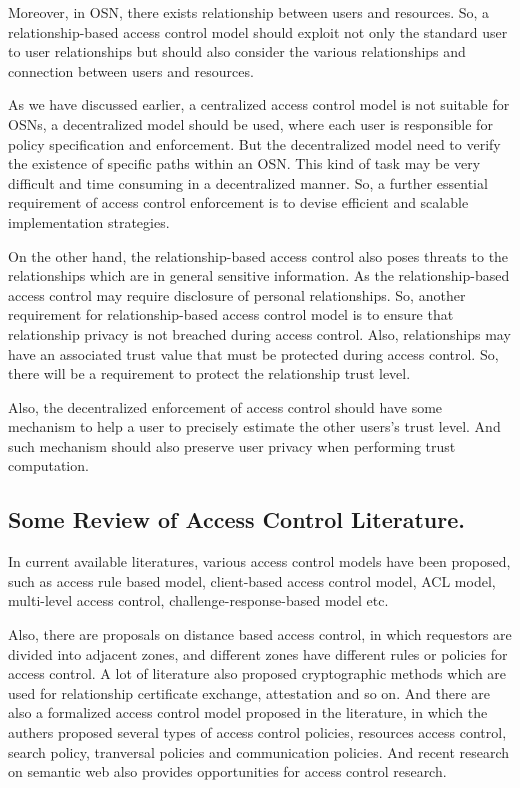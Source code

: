 \documentclass[12pt]{article}
\begin{document}
Moreover, in OSN, there exists relationship between users and
resources. So, a relationship-based access control model should
exploit not only the standard user to user relationships but should
also consider the various relationships and connection between users
and resources. 

As we have discussed earlier, a centralized access control model is
not suitable for OSNs, a decentralized model should be used, where
each user is responsible for policy specification and enforcement. But
the decentralized model need to verify the existence of specific paths
within an OSN. This kind of task may be very difficult and time
consuming in a decentralized manner. So, a further essential
requirement of access control enforcement is to devise efficient and
scalable implementation strategies.

On the other hand, the relationship-based access control also poses
threats to the relationships which are in general sensitive
information. As the relationship-based access control may require
disclosure of personal relationships. So, another requirement for
relationship-based access control model is to ensure that relationship
privacy is not breached during access control. Also, relationships may
have an associated trust value that must be protected during access
control. So, there will be a requirement to protect the relationship
trust level.

Also, the decentralized enforcement of access control should have some
mechanism to help a user to precisely estimate the other users's trust
level. And such mechanism should also preserve user privacy when
performing trust computation. 

\subsection{Some Review of Access Control Literature.}
In current available literatures, various access control models have
been proposed, such as access rule based model, client-based access
control model, ACL model, multi-level access control,
challenge-response-based model etc. 

Also, there are proposals on distance based access control, in which
requestors are divided into adjacent zones, and different zones have
different rules or policies for access control. 
A lot of literature also proposed cryptographic methods which are used
for relationship certificate exchange, attestation and so on. And there
are also a formalized access control model proposed in the literature,
in which the authers proposed several types of access control
policies, resources access control, search policy, tranversal policies
and communication policies. And recent research on semantic web also
provides opportunities for access control research.
\end{document}
